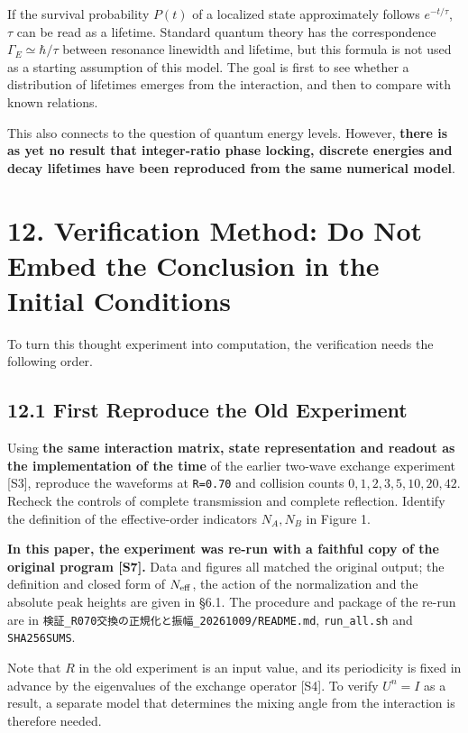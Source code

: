 \documentclass[
  a4paper,
]{article}
\begin{document}
If the survival probability \(P(t)\) of a localized state approximately
follows \(e^{-t/\tau}\), \(\tau\) can be read as a lifetime. Standard
quantum theory has the correspondence \(\Gamma_E\simeq\hbar/\tau\)
between resonance linewidth and lifetime, but this formula is not used
as a starting assumption of this model. The goal is first to see whether
a distribution of lifetimes emerges from the interaction, and then to
compare with known relations.

This also connects to the question of quantum energy levels. However,
\textbf{there is as yet no result that integer-ratio phase locking,
discrete energies and decay lifetimes have been reproduced from the same
numerical model}.

\section{12. Verification Method: Do Not Embed the Conclusion in the
Initial
Conditions}\label{verification-method-do-not-embed-the-conclusion-in-the-initial-conditions}

To turn this thought experiment into computation, the verification needs
the following order.

\subsection{12.1 First Reproduce the Old
Experiment}\label{first-reproduce-the-old-experiment}

Using \textbf{the same interaction matrix, state representation and
readout as the implementation of the time} of the earlier two-wave
exchange experiment {[}S3{]}, reproduce the waveforms at \texttt{R=0.70}
and collision counts \(0,1,2,3,5,10,20,42\). Recheck the controls of
complete transmission and complete reflection. Identify the definition
of the effective-order indicators \(N_A,N_B\) in Figure 1.

\textbf{In this paper, the experiment was re-run with a faithful copy of
the original program {[}S7{]}.} Data and figures all matched the
original output; the definition and closed form of \(N_{\rm eff}\), the
action of the normalization and the absolute peak heights are given in
§6.1. The procedure and package of the re-run are in
\texttt{検証\_\allowbreak{}R070交換の正規化と振幅\_\allowbreak{}20261009/\allowbreak{}README.md},
\texttt{run\_\allowbreak{}all.sh} and \texttt{SHA256SUMS}.

Note that \(R\) in the old experiment is an input value, and its
periodicity is fixed in advance by the eigenvalues of the exchange
operator {[}S4{]}. To verify \(U^n=I\) as a result, a separate model
that determines the mixing angle from the interaction is therefore
needed.
\end{document}
